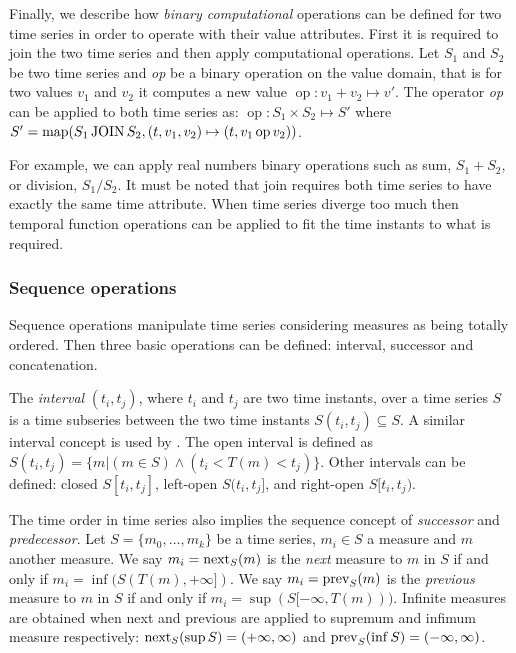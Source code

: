 Finally, we describe how \emph{binary computational} operations can be
defined for two time series in order to operate with their value
attributes.  First it is required to join the two time series and then
apply computational operations. Let $S_1$ and $S_2$ be two time series
and \emph{op} be a binary operation on the value domain, that is for
two values $v_1$ and $v_2$ it computes a new value $\operatorname{op}:
v_1 + v_2 \mapsto v'$. The operator \emph{op} can be applied to both
time series as: $\operatorname{op}: S_1 \times S_2 \mapsto S'$ where
$S' = \operatorname*{map}(S_1 \operatorname*{JOIN} S_2, (t,v_1,v_2)\mapsto(t,v_1 \operatorname{op}
v_2))$.

For example, we can apply real numbers binary operations such as sum,
$S_1 + S_2$, or division, $S_1 / S_2$. It must be noted that join
requires both time series to have exactly the same time
attribute. When time series diverge too much then temporal function
operations can be applied to fit the time instants to what is
required.





\subsubsection{Sequence operations}

Sequence operations manipulate time series considering measures as
being totally ordered. Then three basic operations can be defined:
interval, successor and concatenation.


The \emph{interval} $(t_i,t_j)$, where $t_i$ and $t_j$ are two time
instants, over a time series $S$ is a time subseries between the two
time instants $S(t_i,t_j) \subseteq S$. A similar interval concept
is used by \cite{last:hetland}. The open interval is defined as
$S(t_i,t_j)=\{m | (m\in S) \wedge (t_i<T(m)<t_j)\}$. Other intervals can be
defined: closed $S[t_i,t_j]$, left-open $S(t_i,t_j]$, and right-open
$S[t_i,t_j)$.

The time order in time series also implies the sequence concept of
\emph{successor} and \emph{predecessor}.  Let $S=\{m_0, \ldots, m_k\}$
be a time series, $m_i\in S$ a measure and $m$ another measure. We
say $m_i=\operatorname*{next}_S(m)$ is the \emph{next} measure to $m$ in $S$ if
and only if $m_i=\inf(S(T(m),+\infty])$.  We say $m_i=\operatorname*{prev}_S(m)$
is the \emph{previous} measure to $m$ in $S$ if and only if
$m_i=\sup(S[-\infty,T(m)))$. %
Infinite measures are obtained when next and previous are applied to
supremum and infimum measure respectively: $\operatorname*{next}_S(\sup
S)=(+\infty,\infty)$ and $\operatorname*{prev}_S(\inf S)=(-\infty,\infty)$.



